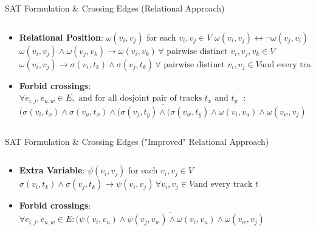 \documentclass[hyperref={pdfpagelabels=false},aspectratio=169]{beamer}
\theoremstyle{definition}
\begin{document}
\begin{frame}{SAT Formulation \& Crossing Edges (Relational Approach)}
    \begin{columns}
        \begin{column}{1\textwidth}
            \begin{itemize}
                \item \textbf{Relational Position}:  $\omega(v_i,v_j)$ for each $v_i,v_j \in V$
                \newline
                \newline
                \cdot $ \omega(v_i,v_j) \leftrightarrow \lnot \omega(v_j,v_i) $
                \newline
                \newline
                \cdot $ \omega(v_i,v_j) \land \omega(v_j,v_k) \rightarrow \omega(v_i,v_k) \, \forall \text{ pairwise distinct } v_i,v_j,v_k \in V$
                \newline
                \newline
                \cdot $ \omega(v_i,v_j) \rightarrow \sigma(v_i,t_k) \land \sigma(v_j,t_k) \, \forall \text{ pairwise distinct } v_i,v_j \in V \text{and every track }t$
                \newline
                \item \textbf{Forbid crossings}: $ \forall e_{i,j}, e_{u,w} \in E, \text{ and for all dosjoint pair of tracks $t_x$ and $t_y$ }:$
                \newline
                \newline
                $ \overline{(\sigma(v_i,t_x) \land \sigma(v_u,t_x) \land (\sigma(v_j,t_y) \land (\sigma(v_w,t_y) \land \omega(v_i,v_u) \land \omega(v_w,v_j)}$
            \end{itemize}
        \end{column}
    \end{columns}
\end{frame}

\begin{frame}{SAT Formulation \& Crossing Edges ("Improved" Relational Approach)}
    \begin{columns}
        \begin{column}{1\textwidth}
            \begin{itemize}
                \item \textbf{Extra Variable}: $\psi(v_i,v_j)$ for each $v_i,v_j \in V$
                \newline
                \newline
                \cdot $ \sigma(v_i,t_k) \land \sigma(v_j,t_k)\rightarrow \psi(v_i,v_j) \, \forall v_i,v_j \in V \text{and every track }t$
                \newline
                \item \textbf{Forbid crossings}: $ \forall e_{i,j}, e_{u,w} \in E : \overline{(\psi(v_i,v_u) \land \psi(v_j,v_w) \land   \omega(v_i,v_u) \land \omega(v_w,v_j)}$
            \end{itemize}
        \end{column}
    \end{columns}
\end{frame}
\end{document}
